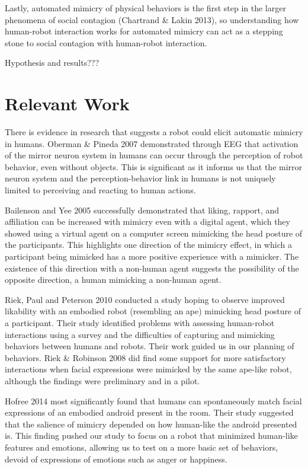 \documentclass{acm_proc_article-sp}
\begin{document}
Lastly, automated mimicry of physical behaviors is the first step in the larger phenomena of social contagion (Chartrand \& Lakin 2013), so understanding how human-robot interaction works for automated mimicry can act as a stepping stone to social contagion with human-robot interaction.

Hypothesis and results???

\section{Relevant Work}
There is evidence in research that suggests a robot could elicit automatic mimicry in humans. Oberman \& Pineda 2007 demonstrated through EEG that activation of the mirror neuron system in humans can occur through the perception of robot behavior, even without objects. This is significant as it informs us that the mirror neuron system and the perception-behavior link in humans is not uniquely limited to perceiving and reacting to human actions. 

Bailenson and Yee 2005 successfully demonstrated that liking, rapport, and affiliation can be increased with mimicry even with a digital agent, which they showed using a virtual agent on a computer screen mimicking the head posture of the participants. This highlights one direction of the mimicry effect, in which a participant being mimicked has a more positive experience with a mimicker. The existence of this direction with a non-human agent suggests the possibility of the opposite direction, a human mimicking a non-human agent. 

Riek, Paul and Peterson 2010 conducted a study hoping to observe improved likability with an embodied robot (resembling an ape) mimicking head posture of a participant. Their study identified problems with assessing human-robot interactions using a survey and the difficulties of capturing and mimicking behaviors between humans and robots. Their work guided us in our planning of behaviors.  Riek \& Robinson 2008 did find some support for more satisfactory interactions when facial expressions were mimicked by the same ape-like robot, although the findings were preliminary and in a pilot.

Hofree 2014 most significantly found that humans can spontaneously match facial expressions of an embodied android present in the room. Their study suggested that the salience of mimicry depended on how human-like the android presented is. This finding pushed our study to focus on a robot that minimized human-like features and emotions, allowing us to test on a more basic set of behaviors, devoid of expressions of emotions such as anger or happiness. 
\end{document}
